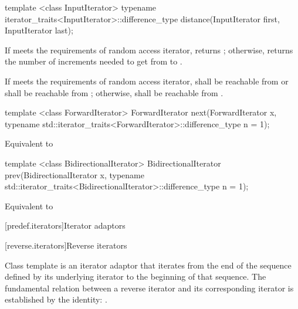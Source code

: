 %
\begin{itemdecl}
template <class InputIterator>
  typename iterator_traits<InputIterator>::difference_type
    distance(InputIterator first, InputIterator last);
\end{itemdecl}

\begin{itemdescr}
\pnum
\effects
If  meets the requirements of random access iterator,
returns ; otherwise, returns
the number of increments needed to get from
to
.

\pnum
\requires
If  meets the requirements of random access iterator,
 shall be reachable from  or  shall be
reachable from ; otherwise,
shall be reachable from
.
\end{itemdescr}

%
\begin{itemdecl}
template <class ForwardIterator>
  ForwardIterator next(ForwardIterator x,
    typename std::iterator_traits<ForwardIterator>::difference_type n = 1);
\end{itemdecl}

\begin{itemdescr}
\pnum
\effects Equivalent to 
\end{itemdescr}

%
\begin{itemdecl}
template <class BidirectionalIterator>
  BidirectionalIterator prev(BidirectionalIterator x,
    typename std::iterator_traits<BidirectionalIterator>::difference_type n = 1);
\end{itemdecl}

\begin{itemdescr}
\pnum
\effects Equivalent to 
\end{itemdescr}

[predef.iterators]{Iterator adaptors}

[reverse.iterators]{Reverse iterators}

\pnum
Class template  is an iterator adaptor that iterates from the end of the sequence defined by its underlying iterator to the beginning of that sequence.
The fundamental relation between a reverse iterator and its corresponding iterator
is established by the identity:
.

